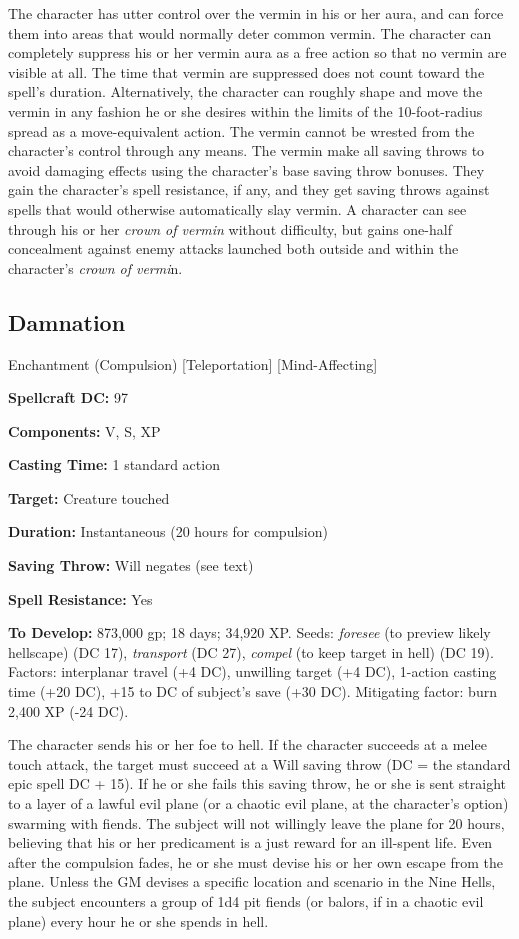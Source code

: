 \documentclass{article}
\begin{document}
The character has utter control over the vermin in his or her aura, and can force 
them into areas that would normally deter common vermin. The character can completely 
suppress his or her vermin aura as a free action so that no vermin are visible 
at all. The time that vermin are suppressed does not count toward the spell's duration. 
Alternatively, the character can roughly shape and move the vermin in any fashion 
he or she desires within the limits of the 10-foot-radius spread as a move-equivalent 
action. The vermin cannot be wrested from the character's control through any means. 
The vermin make all saving throws to avoid damaging effects using the character's 
base saving throw bonuses. They gain the character's spell resistance, if any, 
and they get saving throws against spells that would otherwise automatically slay 
vermin. A character can see through his or her \textit{crown of vermin }without 
difficulty, but gains one-half concealment against enemy attacks launched both 
outside and within the character's \textit{crown of vermi}n. 

\vspace{12pt}
\subsection*{Damnation }

Enchantment (Compulsion) [Teleportation] [Mind-Affecting] 

\textbf{Spellcraft DC:} 97 

\textbf{Components:} V, S, XP 

\textbf{Casting Time:} 1 standard action 

\textbf{Target:} Creature touched 

\textbf{Duration:} Instantaneous (20 hours for compulsion) 

\textbf{Saving Throw:} Will negates (see text) 

\textbf{Spell Resistance:} Yes 

\textbf{To Develop:} 873,000 gp; 18 days; 34,920 XP. Seeds: \textit{foresee }(to 
preview likely hellscape) (DC 17), \textit{transport }(DC 27), \textit{compel }(to 
keep target in hell) (DC 19). Factors: interplanar travel (+4 DC), unwilling target 
(+4 DC), 1-action casting time (+20 DC), +15 to DC of subject's save (+30 DC). 
Mitigating factor: burn 2,400 XP (-24 DC). 

The character sends his or her foe to hell. If the character succeeds at a melee 
touch attack, the target must succeed at a Will saving throw (DC = the standard 
epic spell DC + 15). If he or she fails this saving throw, he or she is sent straight 
to a layer of a lawful evil plane (or a chaotic evil plane, at the character's 
option) swarming with fiends. The subject will not willingly leave the plane for 
20 hours, believing that his or her predicament is a just reward for an ill-spent 
life. Even after the compulsion fades, he or she must devise his or her own escape 
from the plane. Unless the GM devises a specific location and scenario in the Nine 
Hells, the subject encounters a group of 1d4 pit fiends (or balors, if in a chaotic 
evil plane) every hour he or she spends in hell. 
\end{document}
